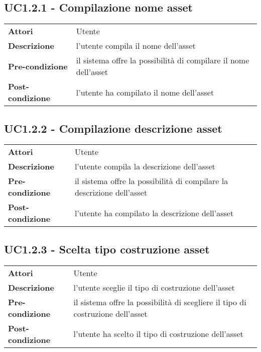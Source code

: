 \subsection{UC1.2.1 - Compilazione nome asset}
\label{sssec:UC1.2.1}
\def\arraystretch{1.5}
\begin{tabularx}{\textwidth}{l|p{}}
\rowcolor{I} \multicolumn{2}{c}{\color{white}\textbf{UC1.2.1 - Compilazione nome asset}} \\
\toprule
\endhead
\textbf{Attori} & Utente\\
\textbf{Descrizione} & l'utente compila il nome dell'asset\\
\textbf{Pre-condizione} & il sistema offre la possibilità di compilare il nome dell'asset\\
\textbf{Post-condizione} & l'utente ha compilato il nome dell'asset\\
\bottomrule
\end{tabularx}
\subsection{UC1.2.2 - Compilazione descrizione asset}
\label{sssec:UC1.2.2}
\def\arraystretch{1.5}
\begin{tabularx}{\textwidth}{l|p{}}
\rowcolor{I} \multicolumn{2}{c}{\color{white}\textbf{UC1.2.2 - Compilazione descrizione asset}} \\
\toprule
\endhead
\textbf{Attori} & Utente\\
\textbf{Descrizione} & l'utente compila la descrizione dell'asset\\
\textbf{Pre-condizione} & il sistema offre la possibilità di compilare la descrizione dell'asset\\
\textbf{Post-condizione} & l'utente ha compilato la descrizione dell'asset\\
\bottomrule
\end{tabularx}
\subsection{UC1.2.3 - Scelta tipo costruzione asset}
\label{sssec:UC1.2.3}
\def\arraystretch{1.5}
\begin{tabularx}{\textwidth}{l|p{}}
\rowcolor{I} \multicolumn{2}{c}{\color{white}\textbf{UC1.2.3 - Scelta tipo costruzione asset}} \\
\toprule
\endhead
\textbf{Attori} & Utente\\
\textbf{Descrizione} & l'utente sceglie il tipo di costruzione dell'asset\\
\textbf{Pre-condizione} & il sistema offre la possibilità di scegliere il tipo di costruzione dell'asset\\
\textbf{Post-condizione} & l'utente ha scelto il tipo di costruzione dell'asset\\
\bottomrule
\end{tabularx}
